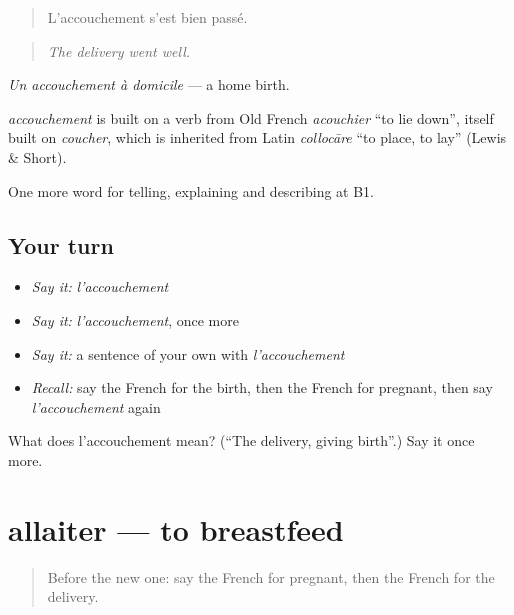 \begin{quote}
L'accouchement s'est bien passé.
\end{quote}

\begin{quote}
\emph{The delivery went well.}
\end{quote}

\emph{Un accouchement à domicile} — a home birth.

\begin{cousinweb}
\emph{accouchement} is built on a verb from Old French \emph{acouchier} \textquotedblleft{}to lie down\textquotedblright{}, itself built on \emph{coucher}, which is inherited from Latin \emph{collocāre} \textquotedblleft{}to place, to lay\textquotedblright{} (Lewis \& Short).
\end{cousinweb}

\begin{grammarlens}[title={What you've built}]
One more word for telling, explaining and describing at B1.
\end{grammarlens}

\subsection*{Your turn}
\begin{itemize}
\raggedright
  \item \emph{Say it:} \emph{l'accouchement}
  \item \emph{Say it:} \emph{l'accouchement}, once more
  \item \emph{Say it:} a sentence of your own with \emph{l'accouchement}
  \item \emph{Recall:} say the French for the birth, then the French for pregnant, then say \emph{l'accouchement} again
\end{itemize}

\begin{tcolorbox}[breakable,colback=teal!4,colframe=teal!35!black,title={Before you move on}]
What does l'accouchement mean? (\textquotedblleft{}The delivery, giving birth\textquotedblright{}.) Say it once more.
\end{tcolorbox}
\section[allaiter]{allaiter — to breastfeed}

\label{lesson:FR-C308-allaiter}



\begin{quote}
Before the new one: say the French for pregnant, then the French for the delivery.
\end{quote}

